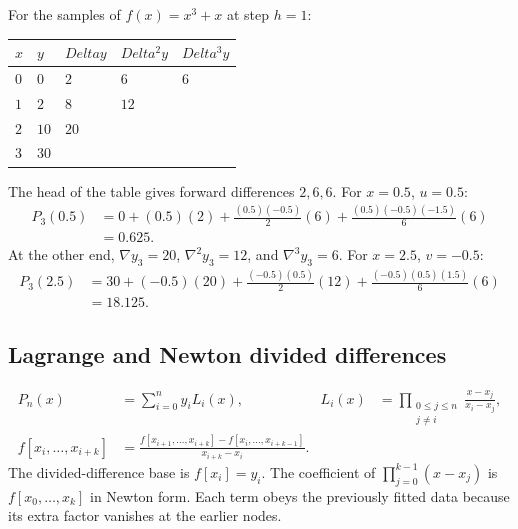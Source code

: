 \documentclass[12pt,a4paper]{article}
\begin{document}
\begin{tcolorbox}[examplebox, title={Build one difference table and use both ends}]
For the samples of $f(x)=x^3+x$ at step $h=1$:
\par\vspace{5pt}
\begingroup
\setlength{\extrarowheight}{1pt}
\noindent\begin{tabularx}{\linewidth}{|B{1.65cm}|Y|Y|Y|Y|}
\hline
\textbf{$x$} & \textbf{$y$} & \textbf{$Delta y$} & \textbf{$Delta^2 y$} & \textbf{$Delta^3 y$} \\ \hline
$0$ & $0$ & $2$ & $6$ & $6$ \\ \hline
$1$ & $2$ & $8$ & $12$ &  \\ \hline
$2$ & $10$ & $20$ &  &  \\ \hline
$3$ & $30$ &  &  &  \\ \hline
\end{tabularx}\par
\endgroup
The head of the table gives forward differences $2,6,6$. For $x=0.5$, $u=0.5$:
\[
\begin{aligned}
P_3(0.5)&=0+(0.5)(2)
  +\frac{(0.5)(-0.5)}{2}(6)
  +\frac{(0.5)(-0.5)(-1.5)}{6}(6)\\
 &=0.625.
\end{aligned}
\]
At the other end, $\nabla y_3=20$, $\nabla^2y_3=12$, and $\nabla^3y_3=6$. For $x=2.5$, $v=-0.5$:
\[
\begin{aligned}
P_3(2.5)&=30+(-0.5)(20)
 +\frac{(-0.5)(0.5)}{2}(12)
 +\frac{(-0.5)(0.5)(1.5)}{6}(6)\\
 &=18.125.
\end{aligned}
\]
\end{tcolorbox}

\subsection{Lagrange and Newton divided differences}
\begin{tcolorbox}[formulabox, title={Lagrange basis and Newton coefficients}]
\[
\begin{aligned}
P_n(x)&=\sum_{i=0}^n y_i L_i(x),
& L_i(x)&=\prod_{\substack{0\le j\le n\\j\ne i}}
 \frac{x-x_j}{x_i-x_j},\\
f[x_i,\ldots,x_{i+k}] &=
\frac{f[x_{i+1},\ldots,x_{i+k}]-f[x_i,\ldots,x_{i+k-1}]}
{x_{i+k}-x_i}. &&
\end{aligned}
\]
The divided-difference base is $f[x_i]=y_i$. The coefficient of $\prod_{j=0}^{k-1}(x-x_j)$ is $f[x_0,\ldots,x_k]$ in Newton form. Each term obeys the previously fitted data because its extra factor vanishes at the earlier nodes.
\end{tcolorbox}
\end{document}
